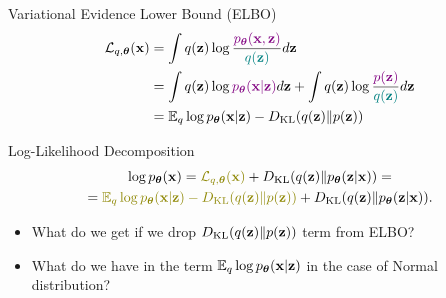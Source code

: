 \documentclass{beamer}
\renewcommand{\eqpause}{}
\renewcommand{\nextonslide}[1]{#1}
\begin{document}
\begin{frame}{Variational Evidence Lower Bound (ELBO)}
	\vspace{-0.3cm}
	\begin{align*}
		\cL_{q, \btheta}(\bx) &= \int q(\bz) \log \frac{\color{violet}\pt(\bx, \bz)}{\color{teal}q(\bz)}d\bz \\ 
		\nextonslide{&= \int q(\bz) \log {\color{violet}\pt(\bx | \bz)} d\bz + \int q(\bz) \log \frac{\color{violet}p(\bz)}{\color{teal}q(\bz)}d\bz} \\ 
		\nextonslide{&= \bbE_{q} \log \pt(\bx | \bz) - \KL (q(\bz) \| p(\bz))}
	\end{align*}
    \eqpause
	\vspace{-0.5cm}
	\begin{block}{Log-Likelihood Decomposition}
		\vspace{-0.8cm}
		\begin{multline*}
			\log \pt(\bx) = {\color{olive}\cL_{q, \btheta}(\bx)} + \KL(q(\bz) \| \pt(\bz|\bx)) 
			\nextonslide{ = \\ = {\color{olive}\bbE_{q} \log \pt(\bx | \bz) - \KL (q(\bz) \| p(\bz))} + \KL(q(\bz) \| \pt(\bz|\bx)).}
		\end{multline*}
		\vspace{-0.7cm}
	\end{block}
    \eqpause
	\begin{itemize}
		\item What do we get if we drop $D_\mathrm{KL} (q(\mathbf{z}) \| p(\mathbf{z}))$ term from ELBO?
		\eqpause
		\item What do we have in the term $\mathbb{E}_{q} \log p_{\boldsymbol{\theta}}(\mathbf{x} | \mathbf{z})$ in the case of Normal distribution?
	\end{itemize}
\end{frame}
\end{document}
